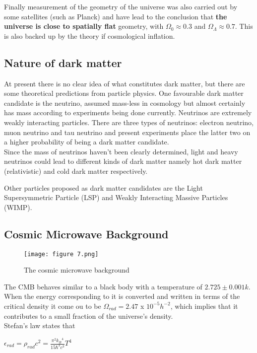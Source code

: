 \documentclass{article}
\begin{document}
Finally measurement of the geometry of the universe was also carried out by some satellites (such as Planck) and have lead to the conclusion that \textbf{the universe is close to spatially flat} geometry, with $\Omega_0 \approx 0.3$ and $\Omega_{\Lambda} \approx 0.7$. This is also backed up by the theory if cosmological inflation.

\subsection{Nature of dark matter}
At present there is no clear idea of what constitutes dark matter, but there are some theoretical predictions from particle physics. One favourable dark matter candidate is the neutrino, assumed mass-less in cosmology but almost certainly has mass according to experiments being done currently. Neutrinos are extremely weakly interacting particles. There are three types of neutrinos: electron neutrino, muon neutrino and tau neutrino and present experiments place the latter two on a higher probability of being a dark matter candidate.
\\
Since the mass of neutrinos haven't been clearly determined, light and heavy neutrinos could lead to different kinds of dark matter namely hot dark matter (relativistic) and cold dark matter respectively.

Other particles proposed as dark matter candidates are the Light Supersymmetric Particle (LSP) and Weakly Interacting Massive Particles (WIMP).

\subsection{Cosmic Microwave Background}

\begin{figure}[H]
    \centering
    \texttt{[image: figure 7.png]}
    \caption{The cosmic microwave background}
    \label{fig:CMB}
\end{figure}

The CMB behaves similar to a black body with a temperature of $2.725 \pm 0.001 k$. When the energy corresponding to it is converted and written in terms of the critical density it come ou to be $\Omega_{rad} = 2.47$ x $10^{-5} h^{-2}$, which implies that it contributes to a small fraction of the universe's density.
\\
Stefan's law states that
\begin{center}
    $\epsilon_{rad} = \rho_{rad}c^2 = \frac{{\pi}^2{k_B}^4}{15{\hbar}^3c^3}T^4$
\end{center}
\end{document}
